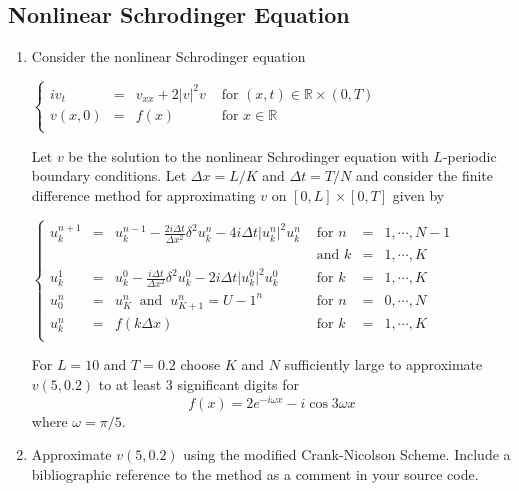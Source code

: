 \documentclass[12pt]{article}
\theoremstyle{definition}
\begin{document}
\subsection*{Nonlinear Schrodinger Equation}

\begin{enumerate}
\item Consider the nonlinear Schrodinger equation
\begin{center}
$\left \{\begin{array}{rcll}
iv_t&=& v_{xx}+2\vert v\vert^2v &\text{ for } (x,t)\in\mathbb{R}\times(0,T)\\
v(x,0)&=&f(x) & \text{ for } x\in\mathbb{R}\\
\end{array}\right.$
\end{center}

Let $v$ be the solution to the nonlinear Schrodinger equation with $L$-periodic boundary conditions. Let $\Delta x=L/K$ and $\Delta t=T/N$ and consider the finite difference method for approximating $v$ on $[0,L]\times[0,T]$ given by
\begin{center}
$\left\{
\begin{array}{rcllrr}
u_k^{n+1}&=& u_k^{n-1}-\frac{2i\Delta t}{\Delta x^2}\delta^2u_k^n-4i\Delta t\vert u_k^n\vert^2u_k^n & \text{ for } n&=& 1,\cdots,N-1\\
&&&\text{ and } k&=&1,\cdots,K\\ 
u_k^1&=& u_k^0-\frac{i\Delta t}{\Delta x^2}\delta^2u_k^0-2i\Delta t\vert u_k^0\vert^2u_k^0 & \text{ for } k&=&1,\cdots,K\\
u_0^n&=&u_K^n\ \text{ and }\ u_{K+1}^n=U-1^n& \text{ for } n&=&0,\cdots,N\\
u_k^n&=&f(k\Delta x) & \text{ for } k&=&1,\cdots,K\\
\end{array}\right.$
\end{center}
For $L=10$ and $T=0.2$ choose $K$ and $N$ sufficiently large to approximate $v(5,0.2)$ to at least $3$ significant digits for
\[f(x)=2e^{-i\omega x}-i\cos{3\omega x}\]
where $\omega=\pi/5$.

\item Approximate $v(5,0.2)$ using the modified Crank-Nicolson Scheme. Include a bibliographic reference to the method as a comment in your source code.

\end{enumerate}
\end{document}
